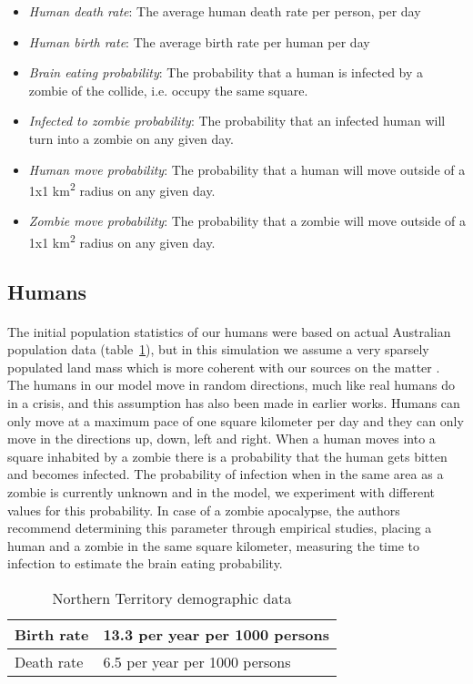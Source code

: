 \documentclass{article}
\begin{document}
\begin{itemize}
\item \emph{Human death rate}: The average human death rate per person, per day
\item \emph{Human birth rate}: The average birth rate per human per day
\item \emph{Brain eating probability}: The probability that a human is infected by a zombie of the collide, i.e. occupy the same square.
\item \emph{Infected to zombie probability}: The probability that an infected human will turn into a zombie on any given day.
\item \emph{Human move probability}: The probability that a human will move outside of a 1x1 km\textsuperscript{2} radius on any given day.
\item \emph{Zombie move probability}: The probability that a zombie will move outside of a 1x1 km\textsuperscript{2} radius on any given day.
\end{itemize}

\subsection{Humans}
\paragraph{}
The initial population statistics of our humans were based on actual Australian population data (table~\ref{AustralianData}), but in this simulation we assume a very sparsely populated land mass which is more coherent with our sources on the matter\cite{zombieland} . The humans in our model move in random directions, much like real humans do in a crisis, and this assumption has also been made in earlier works\cite{munz}. Humans can only move at a maximum pace of one square kilometer per day and they can only move in the directions up, down, left and right. When a human moves into a square inhabited by a zombie there is a probability that the human gets bitten and becomes infected. The probability of infection when in the same area as a zombie is currently unknown and in the model, we experiment with different values for this probability. In case of a zombie apocalypse, the authors recommend determining this parameter through empirical studies, placing a human and a zombie in the same square kilometer, measuring the time to infection to estimate the brain eating probability.
\begin{table}[!h]
\centering
    \begin{tabular}{|l|l|}
      \hline
        Birth rate & 13.3 per year per 1000 persons \\
      \hline
        Death rate & 6.5 per year per 1000 persons \\
      \hline
\end{tabular}
\caption{Northern Territory demographic data}\label{AustralianData}
\end{table}
\end{document}
